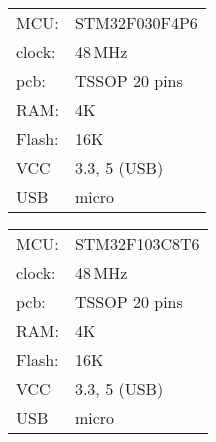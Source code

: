 \clearpage
{}

\begin{minipage}{4cm}
    \begin{tabular}{l l}
    MCU: & STM32F030F4P6 \\
    clock: & 48\,MHz \\
    pcb: & TSSOP 20 pins \\
    RAM: & 4K \\
    Flash: & 16K \\
    VCC & 3.3, 5 (USB) \\
    USB & micro \\
    \end{tabular}
\end{minipage}

\begin{minipage}{4cm}
    \begin{tabular}{l l}
    MCU: & STM32F103C8T6 \\
    clock: & 48\,MHz \\
    pcb: & TSSOP 20 pins \\
    RAM: & 4K \\
    Flash: & 16K \\
    VCC & 3.3, 5 (USB) \\
    USB & micro \\
    \end{tabular}
\end{minipage}


\clearpage
